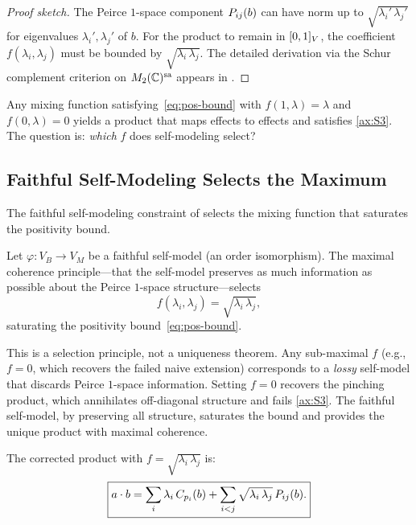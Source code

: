 \documentclass[11pt]{article}
\begin{document}
\begin{proof}[Proof sketch]
  The Peirce $1$-space component $P_{ij}(b)$ can have norm up
  to $\sqrt{\lambda_{i}'\, \lambda_{j}'}$ for eigenvalues
  $\lambda_{i}', \lambda_{j}'$ of $b$.  For the product to remain in
  $[0,1]_{V}$, the coefficient $f(\lambda_{i}, \lambda_{j})$ must be
  bounded by $\sqrt{\lambda_{i}\, \lambda_{j}}$.  The detailed
  derivation via the Schur complement criterion on $M_{2}(\mathbb{C})^{\mathrm{sa}}$ appears
  in .
\end{proof}

Any mixing function satisfying~\eqref{eq:pos-bound} with
$f(1, \lambda) = \lambda$ and $f(0, \lambda) = 0$ yields a product
that maps effects to effects and satisfies \ref{ax:S3}.  The question
is: \emph{which} $f$ does self-modeling select?


\subsection{Faithful Self-Modeling Selects the Maximum}
\label{sec:sp-faithful}

The faithful self-modeling constraint of  selects
the mixing function that saturates the positivity bound.

\begin{proposition}\label{prop:faithful}
  Let $\varphi: V_{B} \to V_{M}$ be a faithful self-model (an order
  isomorphism).  The maximal coherence principle---that the self-model
  preserves as much information as possible about the Peirce
  $1$-space structure---selects
  \begin{equation}\label{eq:faithful-f}
    f(\lambda_{i}, \lambda_{j}) =
    \sqrt{\lambda_{i}\, \lambda_{j}},
  \end{equation}
  saturating the positivity bound~\eqref{eq:pos-bound}.
\end{proposition}

This is a selection principle, not a uniqueness theorem.  Any
sub-maximal $f$ (e.g., $f = 0$, which recovers the failed naive
extension) corresponds to a \emph{lossy} self-model that discards
Peirce $1$-space information.  Setting $f = 0$ recovers the pinching
product, which annihilates off-diagonal structure and fails
\ref{ax:S3}.  The faithful self-model, by preserving all structure,
saturates the bound and provides the unique product with maximal
coherence.

The corrected product with
$f = \sqrt{\lambda_{i}\, \lambda_{j}}$ is:
\begin{equation}\label{eq:corrected-product}
  \boxed{
  a \mathbin{\cdot} b
  = \sum_{i} \lambda_{i}\, C_{p_{i}}(b)
  + \sum_{i < j} \sqrt{\lambda_{i}\, \lambda_{j}}\,
    P_{ij}(b).
  }
\end{equation}
\end{document}
